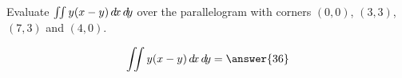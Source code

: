 \documentclass{ximera}
\author{David Guichard \and Neal Koblitz \and H. Jerome Keisler \and Albert Scheller \and Barry Balof \and Mike Wills \and Matthew Carr}
\begin{document}
\begin{exercise}




Evaluate $\iint y(x-y) \mathop{}\!d\! x \mathop{}\!d\! y$ over the parallelogram with corners $(0,0)$, $(3,3)$, $(7,3)$ and $(4,0)$.

\begin{prompt}
\[
\iint y(x-y) \d x \d y=\answer{36}
\]
\end{prompt}



\end{exercise}
\end{document}
